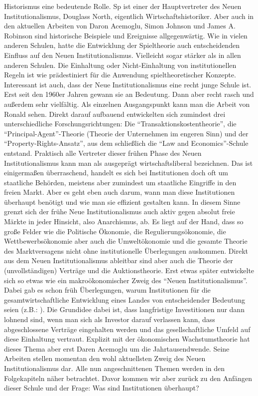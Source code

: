 Historismus eine bedeutende Rolle. Sp ist einer der Hauptvertreter des Neuen Institutionalismus, Douglass North, eigentlich Wirtschaftshistoriker. Aber auch in den aktuellen Arbeiten von Daron Acemoglu, Simon Johnson und James A. Robinson sind historische Beispiele und Ereignisse allgegenwärtig. Wie in vielen anderen Schulen, hatte die Entwicklung der Spieltheorie auch entscheidenden Einfluss auf den Neuen Institutionalismus. Vielleicht sogar stärker als in allen anderen Schulen. Die Einhaltung oder Nicht-Einhaltung von institutionellen Regeln ist wie prädestiniert für die Anwendung spieltheoretischer Konzepte. Interessant ist auch, dass der Neue Institutionalismus eine recht junge Schule ist. Erst seit den 1960er Jahren gewann sie an Bedeutung. Dann aber recht rasch und außerdem sehr vielfältig. Als einzelnen Ausgangspunkt kann man die Arbeit von Ronald \textcite{Coase1960} sehen. Direkt darauf aufbauend entwickelten sich zumindest drei unterschiedliche Forschungsrichtungen: Die "`Transaktionskostentheorie"', die "`Principal-Agent"'-Theorie (Theorie der Unternehmen im engeren Sinn) und der "`Property-Rights-Ansatz"', aus dem schließlich die "`Law and Economics"'-Schule entstand. Praktisch alle Vertreter dieser frühen Phase des Neuen Institutionalismus kann man als ausgeprägt wirtschaftsliberal bezeichnen. Das ist einigermaßen überraschend, handelt es sich bei Institutionen doch oft um staatliche Behörden, meistens aber zumindest um staatliche Eingriffe in den freien Markt. Aber es geht eben auch darum, wann man diese Institutionen überhaupt benötigt und wie man sie effizient gestalten kann. In diesem Sinne grenzt sich der frühe Neue Institutionalismus auch aktiv gegen absolut freie Märkte in jeder Hinsicht, also Anarchismus, ab. Es liegt auf der Hand, dass so große Felder wie die Politische Ökonomie, die Regulierungsökonomie, die Wettbewerbsökonomie aber auch die Umweltökonomie und die gesamte Theorie des Marktversagens nicht ohne institutionelle Überlegungen auskommen. Direkt aus dem Neuen Institutionalismus ableitbar sind aber auch die Theorie der (unvollständigen) Verträge und die Auktionstheorie. Erst etwas später entwickelte sich so etwas wie ein makroökonomischer Zweig des "`Neuen Institutionalismus"'. 
Dabei gab es schon früh Überlegungen, warum Institutionen für die gesamtwirtschaftliche Entwicklung eines Landes von entscheidender Bedeutung seien (z.B.: \textcite[S. 65ff]{North1990}). Die Grundidee dabei ist, dass langfristige Investitionen nur dann lohnend sind, wenn man sich als Investor darauf verlassen kann, dass abgeschlossene Verträge eingehalten werden und das gesellschaftliche Umfeld auf diese Einhaltung vertraut. Explizit mit der ökonomischen Wachstumstheorie hat dieses Thema aber erst Daren Acemoglu um die Jahrtausendwende. Seine Arbeiten stellen momentan den wohl aktuellsten Zweig des Neuen Institutionalismus dar. Alle nun angeschnittenen Themen werden in den Folgekapiteln näher betrachtet. Davor kommen wir aber zurück zu den Anfängen dieser Schule und der Frage: Was sind Institutionen überhaupt?

